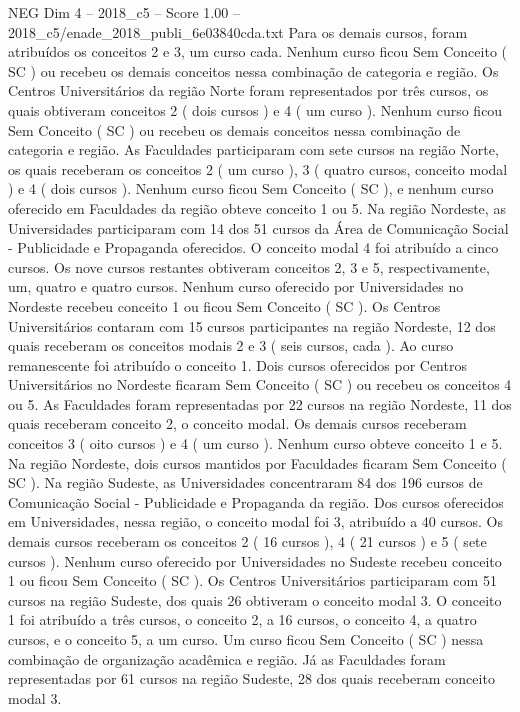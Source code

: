 \begin{textsample}{NEG Dim 4 – 2018\_c5 – Score 1.00 – 2018\_c5/enade\_2018\_publi\_6e03840cda.txt}
Para os demais cursos, foram atribuídos os conceitos 2 e 3, um curso cada.
Nenhum curso ficou Sem Conceito ( SC ) ou recebeu os demais conceitos nessa combinação de categoria e região.
Os Centros Universitários da região Norte foram representados por três cursos, os quais obtiveram conceitos 2 ( dois cursos ) e 4 ( um curso ).
Nenhum curso ficou Sem Conceito ( SC ) ou recebeu os demais conceitos nessa combinação de categoria e região.
As Faculdades participaram com sete cursos na região Norte, os quais receberam os conceitos 2 ( um curso ), 3 ( quatro cursos, conceito modal ) e 4 ( dois cursos ).
Nenhum curso ficou Sem Conceito ( SC ), e nenhum curso oferecido em Faculdades da região obteve conceito 1 ou 5.
Na região Nordeste, as Universidades participaram com 14 dos 51 cursos da Área de Comunicação Social - Publicidade e Propaganda oferecidos.
O conceito modal 4 foi atribuído a cinco cursos.
Os nove cursos restantes obtiveram conceitos 2, 3 e 5, respectivamente, um, quatro e quatro cursos.
Nenhum curso oferecido por Universidades no Nordeste recebeu conceito 1 ou ficou Sem Conceito ( SC ).
Os Centros Universitários contaram com 15 cursos participantes na região Nordeste, 12 dos quais receberam os conceitos modais 2 e 3 ( seis cursos, cada ).
Ao curso remanescente foi atribuído o conceito 1.
Dois cursos oferecidos por Centros Universitários no Nordeste ficaram Sem Conceito ( SC ) ou recebeu os conceitos 4 ou 5.
As Faculdades foram representadas por 22 cursos na região Nordeste, 11 dos quais receberam conceito 2, o conceito modal.
Os demais cursos receberam conceitos 3 ( oito cursos ) e 4 ( um curso ).
Nenhum curso obteve conceito 1 e 5.
Na região Nordeste, dois cursos mantidos por Faculdades ficaram Sem Conceito ( SC ).
Na região Sudeste, as Universidades concentraram 84 dos 196 cursos de Comunicação Social - Publicidade e Propaganda da região.
Dos cursos oferecidos em Universidades, nessa região, o conceito modal foi 3, atribuído a 40 cursos.
Os demais cursos receberam os conceitos 2 ( 16 cursos ), 4 ( 21 cursos ) e 5 ( sete cursos ).
Nenhum curso oferecido por Universidades no Sudeste recebeu conceito 1 ou ficou Sem Conceito ( SC ).
Os Centros Universitários participaram com 51 cursos na região Sudeste, dos quais 26 obtiveram o conceito modal 3.
O conceito 1 foi atribuído a três cursos, o conceito 2, a 16 cursos, o conceito 4, a quatro cursos, e o conceito 5, a um curso.
Um curso ficou Sem Conceito ( SC ) nessa combinação de organização acadêmica e região.
Já as Faculdades foram representadas por 61 cursos na região Sudeste, 28 dos quais receberam conceito modal 3.

\end{textsample}
